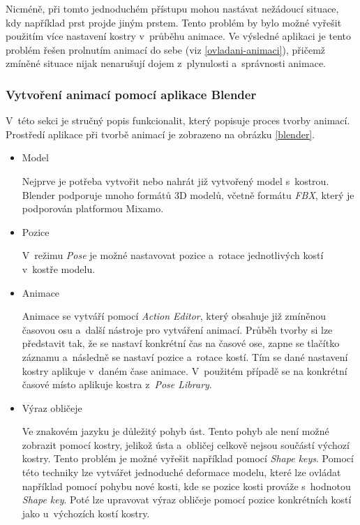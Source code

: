 \documentclass[
  master,
  program=ainfvs,
  biblatex,
  figures=true,
  tables=false,
  sourcecodes=true,
  glossaries,
  index
]{kidiplom}
\begin{document}
            Nicméně, při tomto jednoduchém přístupu mohou nastávat nežádoucí situace, kdy například prst projde jiným prstem. Tento problém by bylo možné vyřešit použitím více nastavení kostry v~průběhu animace. Ve výsledné aplikaci je tento problém řešen prolnutím animací do sebe (viz \ref{ovladani-animaci}), přičemž zmíněné situace nijak nenarušují dojem z~plynulosti a~správnosti animace.
           
        \subsubsection{Vytvoření animací pomocí aplikace Blender}
            V~této sekci je stručný popis funkcionalit, který popisuje proces tvorby animací. Prostředí aplikace při tvorbě animací je zobrazeno na obrázku \ref{blender}.

            \begin{itemize}
                    \item Model \par
                        Nejprve je potřeba vytvořit nebo nahrát již vytvořený model s~kostrou. Blender podporuje mnoho formátů 3D modelů, včetně formátu \emph{FBX}, který je podporován platformou Mixamo.
                        
                    \item Pozice \par
                        V~režimu \emph{Pose} je možné nastavovat pozice a~rotace jednotlivých kostí v~kostře modelu.
                        
                    \item Animace \par
                        Animace se vytváří pomocí \emph{Action Editor}, který obsahuje již zmíněnou časovou osu a~další nástroje pro vytváření animací. Průběh tvorby si lze představit tak, že se nastaví konkrétní čas na časové ose, zapne se tlačítko záznamu a~následně se nastaví pozice a~rotace kostí. Tím se dané nastavení kostry aplikuje v~daném čase animace. V~použitém případě se na konkrétní časové místo aplikuje kostra z~\emph{Pose Library}.
                        
                    \item Výraz obličeje \par
                        Ve znakovém jazyku je důležitý pohyb úst. Tento pohyb ale není možné zobrazit pomocí kostry, jelikož ústa a~obličej celkově nejsou součástí výchozí kostry. Tento problém je možné vyřešit například pomocí \emph{Shape keys}. Pomocí této techniky lze vytvářet jednoduché deformace modelu, které lze ovládat například pomocí pohybu nové kosti, kde se pozice kosti prováže s~hodnotou \emph{Shape key}. Poté lze upravovat výraz obličeje pomocí pozice konkrétních kostí jako u~výchozích kostí kostry.
                \end{itemize}
\end{document}

